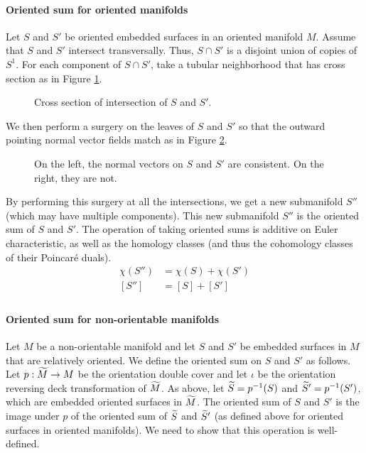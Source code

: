 \paragraph{Oriented sum for oriented manifolds}

Let $S$ and $S'$ be oriented embedded surfaces in an oriented manifold $M$.
Assume that $S$ and $S'$ intersect transversally.
Thus, $S \cap S'$ is a disjoint union of copies of $S^1$.
For each component of $S\cap S'$, take a tubular neighborhood that has cross section as in Figure \ref{fig:cross-section}.

\begin{figure}
  \centering
  \caption{Cross section of intersection of $S$ and $S'$.}
  \label{fig:cross-section}
\end{figure}

We then perform a surgery on the leaves of $S$ and $S'$ so that the outward pointing normal vector fields match as in Figure \ref{fig:surgery}.
\begin{figure}
  \centering
  \caption{On the left, the normal vectors on $S$ and $S'$ are consistent. On the right, they are not.}
  \label{fig:surgery}
\end{figure}

By performing this surgery at all the intersections, we get a new submanifold $S''$ (which may have multiple components).
This new submanifold $S''$ is the oriented sum of $S$ and $S'$.
The operation of taking oriented sums is additive on Euler characteristic, as well as the homology classes (and thus the cohomology classes of their Poincar\'e duals).
\begin{align*}
  \chi(S'') &= \chi(S) + \chi(S') \\
  [S''] &= [S] + [S'] \\
\end{align*}

\paragraph{Oriented sum for non-orientable manifolds}

Let $M$ be a non-orientable manifold and let $S$ and $S'$ be embedded surfaces in $M$ that are relatively oriented.
We define the oriented sum on $S$ and $S'$ as follows.
Let $p:\widetilde{M}\rightarrow M$ be the orientation double cover and let $\iota$ be the orientation reversing deck transformation of $\widetilde{M}$.
As above, let $\widetilde{S}=p^{-1}(S)$ and $\widetilde{S}'=p^{-1}(S')$, which are embedded oriented surfaces in $\widetilde{M}$.
The oriented sum of $S$ and $S'$ is the image under $p$ of the oriented sum of $\widetilde{S}$ and $\widetilde{S}'$ (as defined above for oriented surfaces in oriented manifolds).
We need to show that this operation is well-defined.


